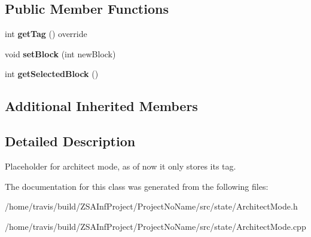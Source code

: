 \subsection*{Public Member Functions}
\begin{DoxyCompactItemize}
\item 
\hypertarget{classArchitectMode_adc0255cf3e5038989bf689cc146c8faa}{int {\bfseries get\-Tag} () override}\label{classArchitectMode_adc0255cf3e5038989bf689cc146c8faa}

\item 
\hypertarget{classArchitectMode_acc7706379dae110787d07d0d176a9dd3}{void {\bfseries set\-Block} (int new\-Block)}\label{classArchitectMode_acc7706379dae110787d07d0d176a9dd3}

\item 
\hypertarget{classArchitectMode_ac692b5626c709a2136457b6b2db67265}{int {\bfseries get\-Selected\-Block} ()}\label{classArchitectMode_ac692b5626c709a2136457b6b2db67265}

\end{DoxyCompactItemize}
\subsection*{Additional Inherited Members}


\subsection{Detailed Description}
Placeholder for architect mode, as of now it only stores its tag. 

The documentation for this class was generated from the following files\-:\begin{DoxyCompactItemize}
\item 
/home/travis/build/\-Z\-S\-A\-Inf\-Project/\-Project\-No\-Name/src/state/Architect\-Mode.\-h\item 
/home/travis/build/\-Z\-S\-A\-Inf\-Project/\-Project\-No\-Name/src/state/Architect\-Mode.\-cpp\end{DoxyCompactItemize}

